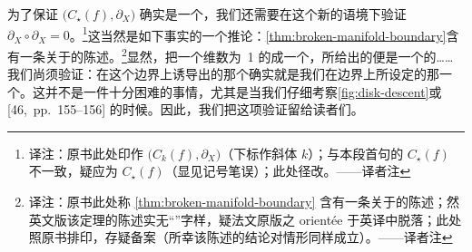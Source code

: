 为了保证 $\bigl(C_{\star}(f),\partial_X\bigr)$ 确实是一个\trComplex，我们还需要在这个新的语境下验证 $\partial_X\circ\partial_X=0$。\footnote{译注：原书此处印作 $\bigl(C_k(f),\partial_X\bigr)$（下标作斜体 $k$）；与本段首句的 $C_{\star}(f)$ 不一致，疑应为 $C_{\star}(f)$（显见记号笔误）；此处径改。——译者注}这当然是如下事实的一个推论：\cref{thm:broken-manifold-boundary}含有一条关于\trOrientation{}的陈述。\footnote{译注：原书此处称 \cref{thm:broken-manifold-boundary} 含有一条关于\trOrientation{}的陈述；然英文版该定理的陈述实无“\trOrientation”字样，疑法文原版之 orientée 于英译中脱落；此处照原书排印，存疑备案（所幸该陈述的结论对\trOrientation{}情形同样成立）。——译者注}显然，把一个维数为~1 的\trOrientation\trManifold\trCompactification{}成一个\trManifoldWithBoundary，所给出的便是一个\trOrientation{}的\trManifoldWithBoundary……我们尚须验证：在这个边界上诱导出的那个\trOrientation{}确实就是我们在边界上所设定的那一个。这并不是一件十分困难的事情，尤其是当我们仔细考察\cref{fig:disk-descent}或 [46,~pp.~155--156] 的时候。因此，我们把这项验证留给读者们。
